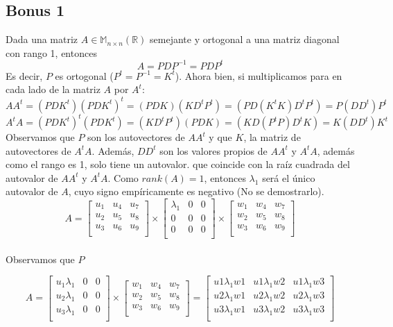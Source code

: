 \documentclass{article}
\begin{document}
\subsection{Bonus 1}
Dada una matriz $A\in\mathbb{M}_{n\times n}(\mathbb{R})$ semejante y ortogonal a una matriz diagonal con rango 1, entonces
$$ A = PDP^{-1} = PDP^t$$
Es decir, $P$ es ortogonal ($P^t=P^{-1}=K^t$). Ahora bien, si multiplicamos para en cada lado de la matriz $A$ por $A^t$:
$$ AA^t = (PDK^t)(PDK^t)^t = (PDK)(KD^tP^t) = (PD(K^tK)D^tP^t) = P(DD^t)P^t $$
$$ A^tA = (PDK^t)^t(PDK^t) = (KD^tP^t)(PDK) = (KD(P^tP)D^tK) = K(DD^t)K^t $$
Observamos que $P$ son los autovectores de $AA^t$ y que $K$, la matriz de autovectores de $A^tA$.\newline
Además, $DD^t$ son los valores propios de $AA^t$ y $A^tA$, además como el rango es 1, solo tiene un autovalor. que coincide con la raíz cuadrada del autovalor de $AA^t$ y $A^tA$.
\newline
Como $rank(A)=1$, entonces $\lambda_1$ será el único autovalor de $A$, cuyo signo empíricamente es negativo (No se demostrarlo).
\[
A=
\begin{bmatrix}
u_1 & u_4 & u_7 \\
u_2 & u_5 & u_8 \\
u_3 & u_6 & u_9 \\
\end{bmatrix}\times
\begin{bmatrix}
\lambda_1 & 0 & 0 \\
0 & 0 & 0 \\
0 & 0 & 0 \\
\end{bmatrix}\times
\begin{bmatrix}
w_1 & w_4 & w_7 \\
w_2 & w_5 & w_8 \\
w_3 & w_6 & w_9 \\
\end{bmatrix}
\]\\

Observamos que $P$ 


\[
A=
\begin{bmatrix}
u_1\lambda_1 & 0 & 0 \\
u_2\lambda_1 & 0 & 0 \\
u_3\lambda_1 & 0 & 0 \\
\end{bmatrix}\times
\begin{bmatrix}
w_1 & w_4 & w_7 \\
w_2 & w_5 & w_8 \\
w_3 & w_6 & w_9 \\
\end{bmatrix}=
\begin{bmatrix}
u1\lambda_1w1 & u1\lambda_1w2 & u1\lambda_1w3 \\
u2\lambda_1w1 & u2\lambda_1w2 & u2\lambda_1w3 \\
u3\lambda_1w1 & u3\lambda_1w2 & u3\lambda_1w3  \\
\end{bmatrix}
\]\\
\end{document}

